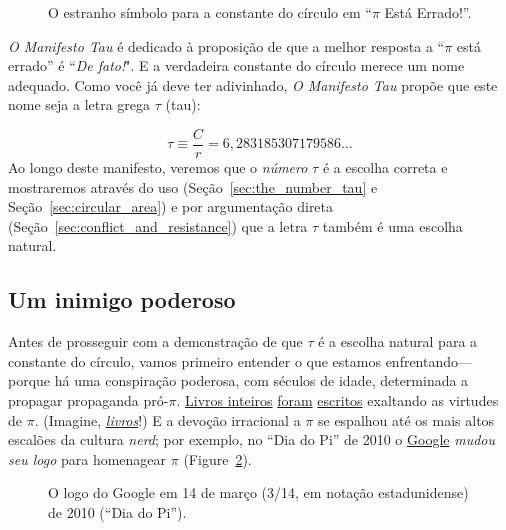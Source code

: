 \begin{figure}
\caption{O estranho símbolo para a constante do círculo em ``$\pi$ Está Errado!''.\label{fig:palais_tau}}
\end{figure}

\emph{O Manifesto Tau} é dedicado à proposição de que a melhor resposta a ``$\pi$ está errado'' é ``\emph{De fato!}". E a verdadeira constante do círculo merece um nome adequado. Como você já deve ter adivinhado, \emph{O Manifesto Tau} propõe que este nome seja a letra grega $\tau$ (tau):

\begin{equation}
\label{eq:tau}
\tau \equiv \frac{C}{r} = 6,283185307179586\ldots
\end{equation}
Ao longo deste manifesto, veremos que o \emph{número} $\tau$ é a escolha correta e mostraremos através do uso (Seção~\ref{sec:the_number_tau} e Seção~\ref{sec:circular_area}) e por argumentação direta (Seção~\ref{sec:conflict_and_resistance}) que a letra $\tau$ também é uma escolha natural.

\subsection{Um inimigo poderoso} %
 \label{sec:a_powerful_enemy}

Antes de prosseguir com a demonstração de que $\tau$ é a escolha natural para a constante do círculo, vamos primeiro entender o que estamos enfrentando---porque há uma conspiração poderosa, com séculos de idade, determinada a propagar propaganda pró-$\pi$. \href{https://www.amazon.com/exec/obidos/ISBN=0802713327/parallaxproductiA/}{Livros inteiros} \href{https://www.amazon.com/Pi-Sky-Counting-Thinking-Being/dp/0198539568}{foram} \href{https://www.amazon.com/exec/obidos/ISBN=0312381859/parallaxproductiA/}{escritos} exaltando as virtudes de $\pi$. (Imagine, \href{https://www.amazon.com/exec/obidos/ISBN=0387989463/parallaxproductiA/}{\emph{livros}}!) E a devoção irracional a $\pi$ se espalhou até os mais altos escalões da cultura \emph{nerd}; por exemplo, no ``Dia do Pi'' de 2010 o \href{https://www.google.com/}{Google} \emph{mudou seu logo} para homenagear $\pi$ (Figure~\ref{fig:google_pi_day.}).

\begin{figure}
\begin{center}
\end{center}
\caption{O logo do Google em 14 de março (3/14, em notação estadunidense) de 2010 (``Dia do Pi'').\label{fig:google_pi_day.}}
\end{figure}

